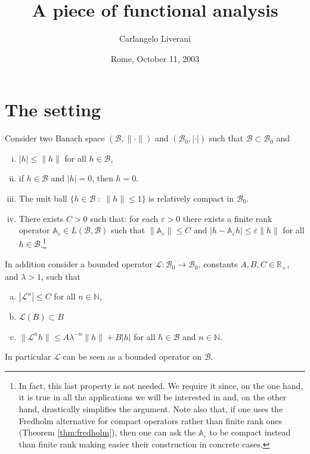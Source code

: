 \documentclass{amsart}
\numberwithin{equation}{section}
\newcommand\B{{\mathcal B}}
\newcommand\Lp{{\mathcal L}}
\newcommand\A{{\mathbb A}}
\newcommand\N{{\mathbb N}}
\newcommand\R{{\mathbb R}}
\newcommand\ve{\varepsilon}
\begin{document}
\title{\bfseries A piece of functional analysis}
\author{Carlangelo Liverani}
\address{Dipartimento di Matematica\\
Universit\`{a} di Roma (Tor Vergata)\\
Via della Ricerca Scientifica, 00133 Roma, Italy\\
{\tt liverani@mat.uniroma2.it}}
\date{Rome, October 11, 2003}
\maketitle


\section{The setting}\label{sec:zero}

Consider two Banach space $(\B,\|\cdot\|)$ and $(\B_0,|\cdot|)$ such
that $\B\subset \B_0$ and
\begin{enumerate}[i.\hskip.4cm]
\item $|h|\leq \|h\|$ for all $h\in\B$,
\item if $h\in\B$ and $|h|=0$, then $h=0$.
\item The unit ball $\{h\in\B\;:\;\|h\|\leq 1\}$ is relatively compact in $\B_0$.
\item There exists $C>0$ such that: for each $\ve>0$ there
exists a finite rank operator $\A_\ve\in L(\B,\B)$ such that $\|\A_\ve\|\leq
C$ and $|h-\A_\ve h|\leq \ve \|h\|$ for all $h\in\B$.\footnote{In fact,
this last property is not needed. We require it since, on the one
hand, it is true in all the 
applications we will be interested in and, on the other hand,
drastically simplifies the argument. Note also that, if one uses the
Fredholm alternative for compact operators rather than finite rank
ones (Theorem \ref{thm:fredholm}), then one can ask the $\A_\ve$ to be compact
instead than finite rank making easier their construction in concrete cases.}
\end{enumerate}

In addition consider a bounded operator $\Lp:\B_0\to\B_0$,
constants $A,B,C\in\R_+$, and $\lambda>1$, such that
\begin{enumerate}[a.\hskip.4cm]
\item   $|\Lp^n|\leq C$ for all $n\in\N$,
\item  $\Lp(B)\subset B$ 
\item  $\|\Lp^nh\|\leq A\lambda^{-n}\|h\|+B|h|$ for all
$h\in\B$ and $n\in\N$. 
\end{enumerate}
In particular $\Lp$ can be seen as a bounded operator on $\B$.
\end{document}
